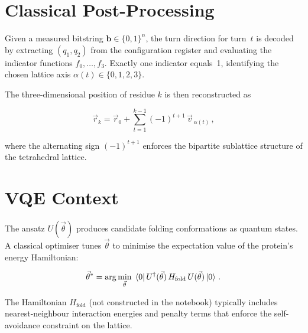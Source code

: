 \documentclass[11pt,a4paper]{article}
\begin{document}
\section{Classical Post-Processing}

Given a measured bitstring $\mathbf{b} \in \{0,1\}^n$, the turn direction for
turn~$t$ is decoded by extracting $(q_1, q_2)$ from the configuration register
and evaluating the indicator functions $f_0, \dots, f_3$. Exactly one indicator
equals~1, identifying the chosen lattice axis $\alpha(t) \in \{0,1,2,3\}$.

The three-dimensional position of residue $k$ is then reconstructed as

\begin{equation}
  \vec{r}_k
    = \vec{r}_0
      + \sum_{t=1}^{k-1} (-1)^{t+1}\, \vec{v}_{\,\alpha(t)}\,,
\end{equation}

where the alternating sign $(-1)^{t+1}$ enforces the bipartite sublattice
structure of the tetrahedral lattice.

\section{VQE Context}

The ansatz $U(\vec\theta)$ produces candidate folding conformations as quantum
states. A classical optimiser tunes $\vec\theta$ to minimise the expectation
value of the protein's energy Hamiltonian:

\begin{equation}
  \vec\theta^{*}
    = \arg\min_{\vec\theta}\;
      \bra{0} U^{\dagger}(\vec\theta)\, H_{\mathrm{fold}}\, U(\vec\theta) \ket{0}\,.
\end{equation}

The Hamiltonian $H_{\mathrm{fold}}$ (not constructed in the notebook) typically
includes nearest-neighbour interaction energies and penalty terms that enforce
the self-avoidance constraint on the lattice.
\end{document}
